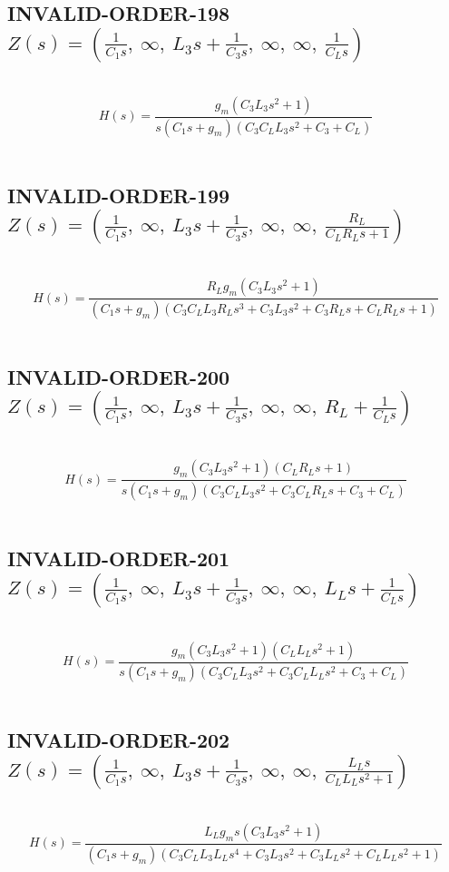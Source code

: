 \documentclass{article}
\begin{document}
\subsection{INVALID-ORDER-198 $Z(s) = \left( \frac{1}{C_{1} s}, \  \infty, \  L_{3} s + \frac{1}{C_{3} s}, \  \infty, \  \infty, \  \frac{1}{C_{L} s}\right)$ } \ 
\textbf{\[H(s) = \frac{g_{m} \left(C_{3} L_{3} s^{2} + 1\right)}{s \left(C_{1} s + g_{m}\right) \left(C_{3} C_{L} L_{3} s^{2} + C_{3} + C_{L}\right)}\] } \ 
\subsection{INVALID-ORDER-199 $Z(s) = \left( \frac{1}{C_{1} s}, \  \infty, \  L_{3} s + \frac{1}{C_{3} s}, \  \infty, \  \infty, \  \frac{R_{L}}{C_{L} R_{L} s + 1}\right)$ } \ 
\textbf{\[H(s) = \frac{R_{L} g_{m} \left(C_{3} L_{3} s^{2} + 1\right)}{\left(C_{1} s + g_{m}\right) \left(C_{3} C_{L} L_{3} R_{L} s^{3} + C_{3} L_{3} s^{2} + C_{3} R_{L} s + C_{L} R_{L} s + 1\right)}\] } \ 
\subsection{INVALID-ORDER-200 $Z(s) = \left( \frac{1}{C_{1} s}, \  \infty, \  L_{3} s + \frac{1}{C_{3} s}, \  \infty, \  \infty, \  R_{L} + \frac{1}{C_{L} s}\right)$ } \ 
\textbf{\[H(s) = \frac{g_{m} \left(C_{3} L_{3} s^{2} + 1\right) \left(C_{L} R_{L} s + 1\right)}{s \left(C_{1} s + g_{m}\right) \left(C_{3} C_{L} L_{3} s^{2} + C_{3} C_{L} R_{L} s + C_{3} + C_{L}\right)}\] } \ 
\subsection{INVALID-ORDER-201 $Z(s) = \left( \frac{1}{C_{1} s}, \  \infty, \  L_{3} s + \frac{1}{C_{3} s}, \  \infty, \  \infty, \  L_{L} s + \frac{1}{C_{L} s}\right)$ } \ 
\textbf{\[H(s) = \frac{g_{m} \left(C_{3} L_{3} s^{2} + 1\right) \left(C_{L} L_{L} s^{2} + 1\right)}{s \left(C_{1} s + g_{m}\right) \left(C_{3} C_{L} L_{3} s^{2} + C_{3} C_{L} L_{L} s^{2} + C_{3} + C_{L}\right)}\] } \ 
\subsection{INVALID-ORDER-202 $Z(s) = \left( \frac{1}{C_{1} s}, \  \infty, \  L_{3} s + \frac{1}{C_{3} s}, \  \infty, \  \infty, \  \frac{L_{L} s}{C_{L} L_{L} s^{2} + 1}\right)$ } \ 
\textbf{\[H(s) = \frac{L_{L} g_{m} s \left(C_{3} L_{3} s^{2} + 1\right)}{\left(C_{1} s + g_{m}\right) \left(C_{3} C_{L} L_{3} L_{L} s^{4} + C_{3} L_{3} s^{2} + C_{3} L_{L} s^{2} + C_{L} L_{L} s^{2} + 1\right)}\] } \ 
\end{document}
